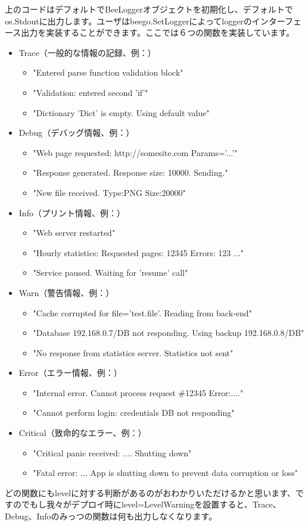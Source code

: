 上のコードはデフォルトでBeeLoggerオブジェクトを初期化し、デフォルトでos.Stdoutに出力します。ユーザはbeego.SetLoggerによってloggerのインターフェース出力を実装することができます。ここでは６つの関数を実装しています。

\begin{itemize}
\item Trace（一般的な情報の記録、例：）
  \begin{itemize}
  \item "Entered parse function validation block"
  \item "Validation: entered second 'if'"
  \item "Dictionary 'Dict' is empty. Using default value"
  \end{itemize}
\item Debug（デバッグ情報、例：）
  \begin{itemize}
  \item "Web page requested: http://somesite.com Params='...'"
  \item "Response generated. Response size: 10000. Sending."
  \item "New file received. Type:PNG Size:20000"
  \end{itemize}
\item Info（プリント情報、例：）
  \begin{itemize}
  \item "Web server restarted"
  \item "Hourly statistics: Requested pages: 12345 Errors: 123 ..."
  \item "Service paused. Waiting for 'resume' call"
  \end{itemize}
\item Warn（警告情報、例：）
  \begin{itemize}
  \item "Cache corrupted for file='test.file'. Reading from back-end"
  \item "Database 192.168.0.7/DB not responding. Using backup 192.168.0.8/DB"
  \item "No response from statistics server. Statistics not sent"
  \end{itemize}
\item Error（エラー情報、例：）
  \begin{itemize}
  \item "Internal error. Cannot process request \#12345 Error:...."
  \item "Cannot perform login: credentials DB not responding"
  \end{itemize}
\item Critical（致命的なエラー、例：）
  \begin{itemize}
  \item "Critical panic received: .... Shutting down"
  \item "Fatal error: ... App is shutting down to prevent data corruption or loss"
  \end{itemize}
\end{itemize}

どの関数にもlevelに対する判断があるのがおわかりいただけるかと思います、ですのでもし我々がデプロイ時にlevel=LevelWarningを設置すると、Trace、Debug、Infoのみっつの関数は何も出力しなくなります。
